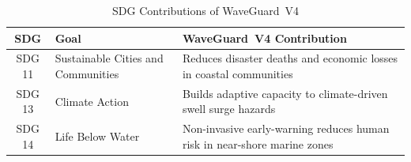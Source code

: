 \begin{table}[H]
\centering
\caption{SDG Contributions of WaveGuard~V4}
\label{tab:sdg}
\begin{tabularx}{\textwidth}{cXX}
\toprule
\textbf{SDG} & \textbf{Goal} & \textbf{WaveGuard~V4 Contribution} \\
\midrule
SDG 11 & Sustainable Cities and Communities &
  Reduces disaster deaths and economic losses in coastal communities \\
\addlinespace
SDG 13 & Climate Action &
  Builds adaptive capacity to climate-driven swell surge hazards \\
\addlinespace
SDG 14 & Life Below Water &
  Non-invasive early-warning reduces human risk in near-shore marine zones \\
\bottomrule
\end{tabularx}
\end{table}
